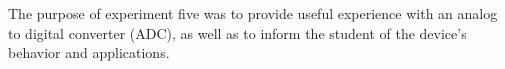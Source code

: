 The purpose of experiment five was to provide useful experience with an analog to digital converter (ADC), as well as to inform the student of the device's behavior and applications.
